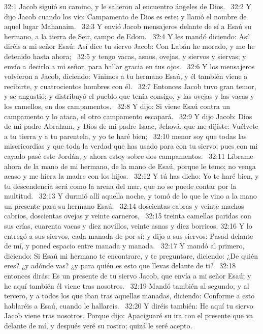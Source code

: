 32:1 Jacob siguió su camino, y le salieron al encuentro ángeles de Dios.  
32:2 Y dijo Jacob cuando los vio: Campamento de Dios es este; y llamó el nombre de aquel lugar Mahanaim.  
32:3 Y envió Jacob mensajeros delante de sí a Esaú su hermano, a la tierra de Seir, campo de Edom.  
32:4 Y les mandó diciendo: Así diréis a mi señor Esaú: Así dice tu siervo Jacob: Con Labán he morado, y me he detenido hasta ahora;  
32:5 y tengo vacas, asnos, ovejas, y siervos y siervas; y envío a decirlo a mi señor, para hallar gracia en tus ojos.  
32:6 Y los mensajeros volvieron a Jacob, diciendo: Vinimos a tu hermano Esaú, y él también viene a recibirte, y cuatrocientos hombres con él.  
32:7 Entonces Jacob tuvo gran temor, y se angustió; y distribuyó el pueblo que tenía consigo, y las ovejas y las vacas y los camellos, en dos campamentos.  
32:8 Y dijo: Si viene Esaú contra un campamento y lo ataca, el otro campamento escapará.  
32:9 Y dijo Jacob: Dios de mi padre Abraham, y Dios de mi padre Isaac, Jehová, que me dijiste: Vuélvete a tu tierra y a tu parentela, y yo te haré bien;  
32:10 menor soy que todas las misericordias y que toda la verdad que has usado para con tu siervo; pues con mi cayado pasé este Jordán, y ahora estoy sobre dos campamentos.  
32:11 Líbrame ahora de la mano de mi hermano, de la mano de Esaú, porque le temo; no venga acaso y me hiera la madre con los hijos.  
32:12 Y tú has dicho: Yo te haré bien, y tu descendencia será como la arena del mar, que no se puede contar por la multitud.  
32:13 Y durmió allí aquella noche, y tomó de lo que le vino a la mano un presente para su hermano Esaú:  
32:14 doscientas cabras y veinte machos cabríos, doscientas ovejas y veinte carneros,  
32:15 treinta camellas paridas con sus crías, cuarenta vacas y diez novillos, veinte asnas y diez borricos. 
32:16 Y lo entregó a sus siervos, cada manada de por sí; y dijo a sus siervos: Pasad delante de mí, y poned espacio entre manada y manada.  
32:17 Y mandó al primero, diciendo: Si Esaú mi hermano te encontrare, y te preguntare, diciendo: ¿De quién eres? ¿y adónde vas? ¿y para quién es esto que llevas delante de ti?  
32:18 entonces dirás: Es un presente de tu siervo Jacob, que envía a mi señor Esaú; y he aquí también él viene tras nosotros.  
32:19 Mandó también al segundo, y al tercero, y a todos los que iban tras aquellas manadas, diciendo: Conforme a esto hablaréis a Esaú, cuando le hallareis.  
32:20 Y diréis también: He aquí tu siervo Jacob viene tras nosotros. Porque dijo: Apaciguaré su ira con el presente que va delante de mí, y después veré su rostro; quizá le seré acepto.  
